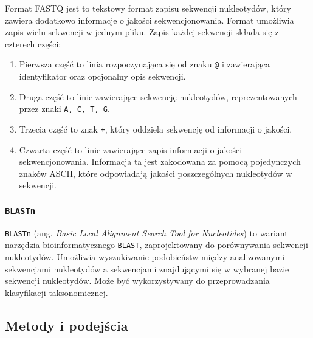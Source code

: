             Format FASTQ jest to tekstowy format zapisu sekwencji nukleotydów, który zawiera dodatkowo informacje o jakości sekwencjonowania. Format umożliwia zapis wielu sekwencji w jednym pliku. Zapis każdej sekwencji składa się z czterech części: 
            \begin{enumerate}
                \item {
                    Pierwsza część to linia rozpoczynająca się od znaku \texttt{@} i zawierająca identyfikator oraz opcjonalny opis sekwencji.
                }
                \item {
                    Druga część to linie zawierające sekwencję nukleotydów, reprezentowanych przez znaki \texttt{A, C, T, G}.
                }
                \item {
                    Trzecia część to znak \texttt{+}, który oddziela sekwencję od informacji o jakości.
                }
                \item {
                    Czwarta część to linie zawierające zapis informacji o jakości sekwencjonowania. Informacja ta jest zakodowana za pomocą pojedynczych znaków ASCII, które odpowiadają jakości poszczególnych nukleotydów w sekwencji.
                }
            \end{enumerate}

        \subsubsection{\texttt{BLASTn}}

            \texttt{BLASTn} (ang. \textit{Basic Local Alignment Search Tool for Nucleotides}) to wariant narzędzia bioinformatycznego \texttt{BLAST}, zaprojektowany do porównywania sekwencji nukleotydów. Umożliwia wyszukiwanie podobieństw między analizowanymi sekwencjami nukleotydów a sekwencjami znajdującymi się w wybranej bazie sekwencji nukleotydów. Może być wykorzystywany do przeprowadzania klasyfikacji taksonomicznej.



    \subsection{Metody i podejścia}

